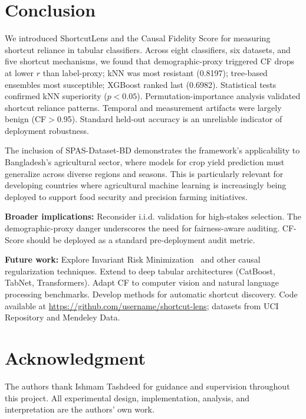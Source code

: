 \documentclass[conference]{IEEEtran}
\begin{document}
\section{Conclusion}
\label{sec:conclusion}

We introduced ShortcutLens and the Causal Fidelity Score for measuring shortcut reliance in tabular classifiers. Across eight classifiers, six datasets, and five shortcut mechanisms, we found that demographic-proxy triggered CF drops at lower $r$ than label-proxy; kNN was most resistant (0.8197); tree-based ensembles most susceptible; XGBoost ranked last (0.6982). Statistical tests confirmed kNN superiority ($p<0.05$). Permutation-importance analysis validated shortcut reliance patterns. Temporal and measurement artifacts were largely benign (CF$>$0.95). Standard held-out accuracy is an unreliable indicator of deployment robustness.

The inclusion of SPAS-Dataset-BD demonstrates the framework's applicability to Bangladesh's agricultural sector, where models for crop yield prediction must generalize across diverse regions and seasons. This is particularly relevant for developing countries where agricultural machine learning is increasingly being deployed to support food security and precision farming initiatives.

\textbf{Broader implications:} Reconsider i.i.d. validation for high-stakes selection. The demographic-proxy danger underscores the need for fairness-aware auditing. CF-Score should be deployed as a standard pre-deployment audit metric.

\textbf{Future work:} Explore Invariant Risk Minimization~\cite{arjovsky2019irm} and other causal regularization techniques. Extend to deep tabular architectures (CatBoost, TabNet, Transformers). Adapt CF to computer vision and natural language processing benchmarks. Develop methods for automatic shortcut discovery. Code available at \url{https://github.com/username/shortcut-lens}; datasets from UCI Repository and Mendeley Data.


\section*{Acknowledgment}

The authors thank Ishmam Tashdeed for guidance and supervision throughout this project. All experimental design, implementation, analysis, and interpretation are the authors' own work.





\balance
\end{document}
